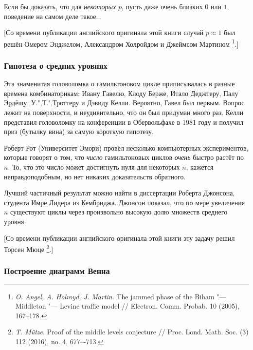 \documentclass[twoside]{book}
\begin{document}
Если бы  доказать, что для \emph{некоторых} $p$, пусть даже очень близких  $0$ или $1$, поведение на самом деле такое...

[Со времени публикации английского оригинала этой книги случай $p\approx 1$ был решён Омером Энджелом,
Александром Холройдом и Джеймсом Мартином%
\footnote{\emph{O. Angel, A. Holroyd, J. Martin}. 
The jammed phase of the Biham "--- Middleton "--- Levine traffic model /\!/
{Electron. Comm. Probab.} 10 (2005), 167--178.}.]

\subsubsection*{Гипотеза о средних уровнях}

Эта знаменитая головоломка о гамильтоновом цикле приписывалась в разные времена комбинаторикам: Ивану Гавелю, Клоду Берже, Итало Деджтеру, Палу Эрдёшу, У.",Т.",Троттеру и Дэвиду Келли.
Вероятно, Гавел был первым.
Вопрос лежит на поверхности, и неудивительно, что он был придуман много раз.
Келли представил головоломку на конференции в Обервольфахе в 1981 году и получил приз (бутылку вина) за самую короткую гипотезу.


Роберт Рот (Университет Эмори)  провёл несколько компьютерных экспериментов, которые говорят о том, что \emph{число} гамильтоновых циклов \emph{очень} быстро растёт по $n$.
То, что это число может достигнуть нуля для некоторых $n$, кажется неправдоподобным, но нет никаких доказательств обратного.

Лучший частичный результат можно найти в диссертации Роберта Джонсона, студента Имре Лидера из Кембриджа.
Джонсон показал, что по мере увеличения $n$ существуют циклы через произвольно высокую долю множеств среднего уровня.

[Со времени публикации английского оригинала этой книги эту задачу решил Торсен Мюце%
\footnote{\emph{T. Mütze}. 
Proof of the middle levels conjecture /\!/
{Proc. Lond. Math. Soc.} (3) 112 (2016), no. 4, 677–-713.}.]

\subsubsection*{Построение диаграмм Венна}
\end{document}
